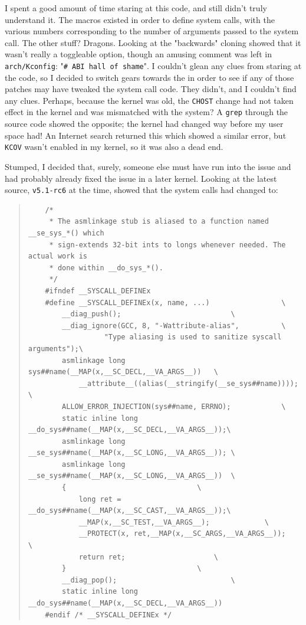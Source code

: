 \documentclass{article}
\begin{document}
I spent a good amount of time staring at this code, and still didn't truly understand it.  The macros existed in order to define system calls, with the various numbers corresponding to the number of arguments passed to the system call.  The other stuff?  Dragons.  Looking at the "backwards" cloning showed that it wasn't really a toggleable option, though an amusing comment was left in \texttt{arch/Kconfig}: "\texttt{# ABI hall of shame}".  I couldn't glean any clues from staring at the code, so I decided to switch gears towards the  in order to see if any of those patches may have tweaked the system call code.  They didn't, and I couldn't find any clues.  Perhaps, because the kernel was old, the \texttt{CHOST} change had not taken effect in the kernel and was mismatched with the system?  A \texttt{grep} through the source code showed the opposite; the kernel had changed way before my user space had!  An Internet search returned this  which showed a similar error, but \texttt{KCOV} wasn't enabled in my kernel, so it was also a dead end.

Stumped, I decided that, surely, someone else must have run into the issue and had probably already fixed the issue in a later kernel.  Looking at the latest source, \texttt{v5.1-rc6} at the time, showed that the system calls had changed to:

\begin{quote}
\begin{verbatim}
	/*
	 * The asmlinkage stub is aliased to a function named __se_sys_*() which
	 * sign-extends 32-bit ints to longs whenever needed. The actual work is
	 * done within __do_sys_*().
	 */
	#ifndef __SYSCALL_DEFINEx
	#define __SYSCALL_DEFINEx(x, name, ...)					\
		__diag_push();							\
		__diag_ignore(GCC, 8, "-Wattribute-alias",			\
			      "Type aliasing is used to sanitize syscall arguments");\
		asmlinkage long sys##name(__MAP(x,__SC_DECL,__VA_ARGS__))	\
			__attribute__((alias(__stringify(__se_sys##name))));	\
		ALLOW_ERROR_INJECTION(sys##name, ERRNO);			\
		static inline long __do_sys##name(__MAP(x,__SC_DECL,__VA_ARGS__));\
		asmlinkage long __se_sys##name(__MAP(x,__SC_LONG,__VA_ARGS__));	\
		asmlinkage long __se_sys##name(__MAP(x,__SC_LONG,__VA_ARGS__))	\
		{								\
			long ret = __do_sys##name(__MAP(x,__SC_CAST,__VA_ARGS__));\
			__MAP(x,__SC_TEST,__VA_ARGS__);				\
			__PROTECT(x, ret,__MAP(x,__SC_ARGS,__VA_ARGS__));	\
			return ret;						\
		}								\
		__diag_pop();							\
		static inline long __do_sys##name(__MAP(x,__SC_DECL,__VA_ARGS__))
	#endif /* __SYSCALL_DEFINEx */
\end{verbatim}
\end{quote}
\end{document}
